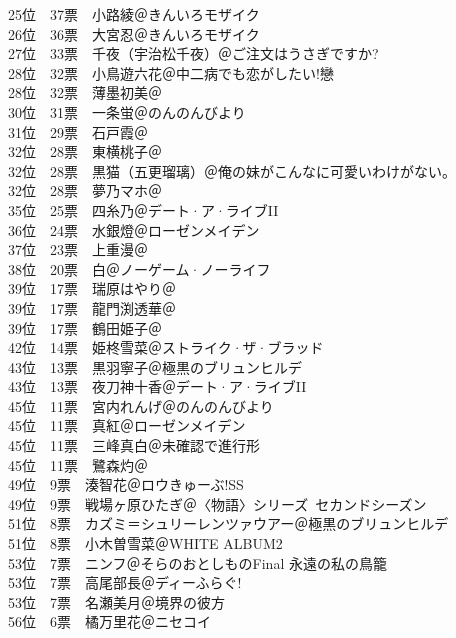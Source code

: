 { 25位　37票　小路綾＠きんいろモザイク\\
 26位　36票　大宮忍＠きんいろモザイク\\
 27位　33票　千夜（宇治松千夜）＠ご注文はうさぎですか?\\
 28位　32票　小鳥遊六花＠中二病でも恋がしたい!戀\\
 28位　32票　薄墨初美＠\Saki\\
 30位　31票　一条蛍＠のんのんびより\\
 31位　29票　石戸霞＠\Saki\\
 32位　28票　東横桃子＠\Saki\\
 32位　28票　黒猫（五更瑠璃）＠俺の妹がこんなに可愛いわけがない。\\
 32位　28票　夢乃マホ＠\Saki\\
 35位　25票　四糸乃＠デート·ア·ライブII\\
 36位　24票　水銀燈＠ローゼンメイデン\\
 37位　23票　上重漫＠\Saki\\
 38位　20票　白＠ノーゲーム·ノーライフ\\
 39位　17票　瑞原はやり＠\Saki\\
 39位　17票　龍門渕透華＠\Saki\\
 39位　17票　鶴田姫子＠\Saki\\
 42位　14票　姫柊雪菜＠ストライク·ザ·ブラッド\\
 43位　13票　黒羽寧子＠極黒のブリュンヒルデ\\
 43位　13票　夜刀神十香＠デート·ア·ライブII\\
 45位　11票　宮内れんげ＠のんのんびより\\
 45位　11票　真紅＠ローゼンメイデン\\
 45位　11票　三峰真白＠未確認で進行形\\
 45位　11票　鷺森灼＠\Saki\\
 49位　9票　湊智花＠ロウきゅーぶ!SS\\
 49位　9票　戦場ヶ原ひたぎ＠〈物語〉シリーズ~セカンドシーズン\\
 51位　8票　カズミ＝シュリーレンツァウアー＠極黒のブリュンヒルデ\\
 51位　8票　小木曽雪菜＠WHITE ALBUM2\\
 53位　7票　ニンフ＠そらのおとしものFinal 永遠の私の鳥籠\\
 53位　7票　高尾部長＠ディーふらぐ!\\
 53位　7票　名瀬美月＠境界の彼方\\
 56位　6票　橘万里花＠ニセコイ\\
}
